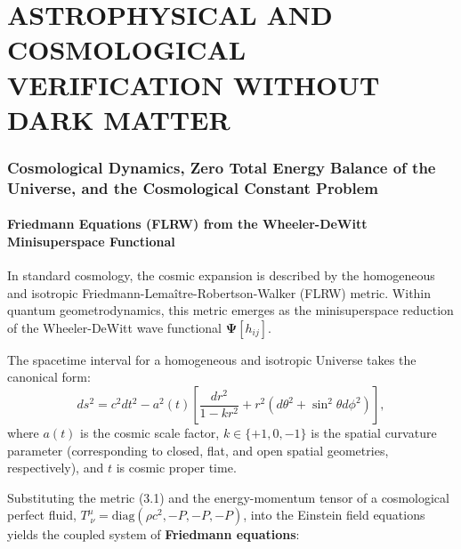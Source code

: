 \documentclass[11pt,a4paper]{article}
\theoremstyle{definition}
\begin{document}
\part{ASTROPHYSICAL AND COSMOLOGICAL VERIFICATION WITHOUT DARK MATTER}\label{part:3}

\section{Cosmological Dynamics, Zero Total Energy Balance of the Universe, and the Cosmological Constant Problem}\label{sec:rozdil3}

\subsection{Friedmann Equations (FLRW) from the Wheeler-DeWitt Minisuperspace Functional}\label{sec:3.1}

In standard cosmology, the cosmic expansion is described by the homogeneous and isotropic Friedmann-Lema\^{i}tre-Robertson-Walker (FLRW) metric. Within quantum geometrodynamics, this metric emerges as the minisuperspace reduction of the Wheeler-DeWitt wave functional $\mathbf{\Psi}[h_{ij}]$.

The spacetime interval for a homogeneous and isotropic Universe takes the canonical form:
\begin{equation}\label{eq:3.1}\tag{3.1}
ds^2 = c^2 dt^2 - a^2(t) \left[ \frac{dr^2}{1 - k r^2} + r^2 (d\theta^2 + \sin^2\theta d\phi^2) \right],
\end{equation}
where $a(t)$ is the cosmic scale factor, $k \in \{+1, 0, -1\}$ is the spatial curvature parameter (corresponding to closed, flat, and open spatial geometries, respectively), and $t$ is cosmic proper time.

Substituting the metric (3.1) and the energy-momentum tensor of a cosmological perfect fluid, $T^\mu_{\;\nu} = \text{diag}(\rho c^2, -P, -P, -P)$, into the Einstein field equations yields the coupled system of \textbf{Friedmann equations}:
\end{document}
